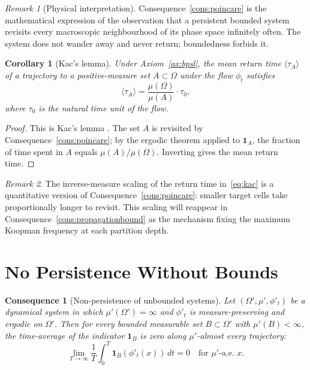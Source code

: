 \documentclass[11pt,twocolumn,a4paper]{article}
\theoremstyle{axiomstyle}
\theoremstyle{conseqstyle}
\newtheorem{consequence}{Consequence}
\newtheorem{corollary}{Corollary}
\theoremstyle{definition}
\theoremstyle{remark}
\newtheorem*{remark}{Remark}
\begin{document}
\begin{remark}[Physical interpretation]
Consequence~\ref{cons:poincare} is the mathematical expression of the observation that a persistent bounded system revisits every macroscopic neighbourhood of its phase space infinitely often. The system does not wander away and never return; boundedness forbids it.
\end{remark}

\begin{corollary}[Kac's lemma]
\label{cor:kac}
Under Axiom~\ref{ax:bpsl}, the mean return time $\langle\tau_{A}\rangle$ of a trajectory to a positive-measure set $A\subset\Omega$ under the flow $\phi_{t}$ satisfies
\begin{equation}
\langle\tau_{A}\rangle=\frac{\mu(\Omega)}{\mu(A)}\cdot\tau_{0},
\label{eq:kac}
\end{equation}
where $\tau_{0}$ is the natural time unit of the flow.
\end{corollary}

\begin{proof}
This is Kac's lemma \citep{kac1947}. The set $A$ is revisited by Consequence~\ref{cons:poincare}; by the ergodic theorem \citep{birkhoff1931} applied to $\mathbf{1}_{A}$, the fraction of time spent in $A$ equals $\mu(A)/\mu(\Omega)$. Inverting gives the mean return time.
\end{proof}

\begin{remark}
The inverse-measure scaling of the return time in~\eqref{eq:kac} is a quantitative version of Consequence~\ref{cons:poincare}: smaller target cells take proportionally longer to revisit. This scaling will reappear in Consequence~\ref{cons:propagationbound} as the mechanism fixing the maximum Koopman frequency at each partition depth.
\end{remark}

\section{No Persistence Without Bounds}
\label{sec:noboundsnopersistence}

\begin{consequence}[Non-persistence of unbounded systems]
\label{cons:noboundsnopersistence}
Let $(\Omega',\mu',\phi'_{t})$ be a dynamical system in which $\mu'(\Omega')=\infty$ and $\phi'_{t}$ is measure-preserving and ergodic on $\Omega'$. Then for every bounded measurable set $B\subset\Omega'$ with $\mu'(B)<\infty$, the time-average of the indicator $\mathbf{1}_{B}$ is zero along $\mu'$-almost every trajectory:
\begin{equation}
\lim_{T\to\infty}\frac{1}{T}\int_{0}^{T}\mathbf{1}_{B}(\phi'_{t}(x))\,dt = 0 \quad \text{for $\mu'$-a.e. } x.
\label{eq:dispersion}
\end{equation}
\end{consequence}
\end{document}
